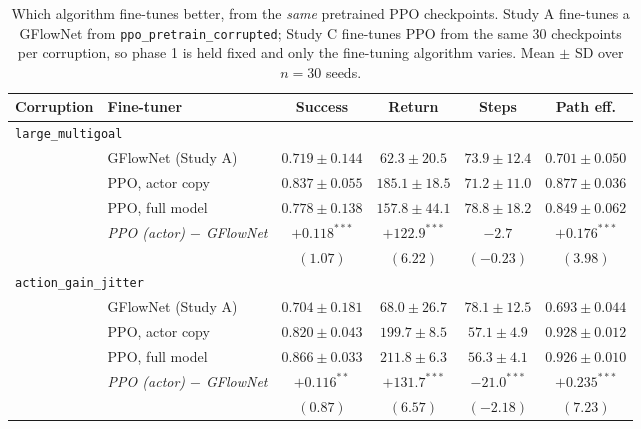 \begin{table}[htbp]
\centering
\setlength{\tabcolsep}{4pt}
\caption{Which algorithm fine-tunes better, from the \emph{same} pretrained PPO
checkpoints. Study A fine-tunes a GFlowNet from \texttt{ppo\_pretrain\_corrupted};
Study C fine-tunes PPO from the same 30 checkpoints per corruption, so phase 1
is held fixed and only the fine-tuning algorithm varies. Mean $\pm$ SD over
$n=30$ seeds.}
\small
\begin{tabular}{llcccc}
\toprule
Corruption & Fine-tuner & Success & Return & Steps & Path eff. \\
\midrule
\multicolumn{6}{l}{\texttt{large\_multigoal}} \\
 & GFlowNet (Study A)      & $0.719 \pm 0.144$ & $62.3 \pm 20.5$ & $73.9 \pm 12.4$ & $0.701 \pm 0.050$ \\
 & PPO, actor copy         & $0.837 \pm 0.055$ & $185.1 \pm 18.5$ & $71.2 \pm 11.0$ & $0.877 \pm 0.036$ \\
 & PPO, full model         & $0.778 \pm 0.138$ & $157.8 \pm 44.1$ & $78.8 \pm 18.2$ & $0.849 \pm 0.062$ \\
 & \emph{PPO (actor) $-$ GFlowNet} & $+0.118^{***}$ & $+122.9^{***}$ & $-2.7$ & $+0.176^{***}$ \\
 &                         & \footnotesize$(1.07)$ & \footnotesize$(6.22)$ & \footnotesize$(-0.23)$ & \footnotesize$(3.98)$ \\
\midrule
\multicolumn{6}{l}{\texttt{action\_gain\_jitter}} \\
 & GFlowNet (Study A)      & $0.704 \pm 0.181$ & $68.0 \pm 26.7$ & $78.1 \pm 12.5$ & $0.693 \pm 0.044$ \\
 & PPO, actor copy         & $0.820 \pm 0.043$ & $199.7 \pm 8.5$ & $57.1 \pm 4.9$ & $0.928 \pm 0.012$ \\
 & PPO, full model         & $0.866 \pm 0.033$ & $211.8 \pm 6.3$ & $56.3 \pm 4.1$ & $0.926 \pm 0.010$ \\
 & \emph{PPO (actor) $-$ GFlowNet} & $+0.116^{**}$ & $+131.7^{***}$ & $-21.0^{***}$ & $+0.235^{***}$ \\
 &                         & \footnotesize$(0.87)$ & \footnotesize$(6.57)$ & \footnotesize$(-2.18)$ & \footnotesize$(7.23)$ \\
\bottomrule
\end{tabular}
\end{table}

